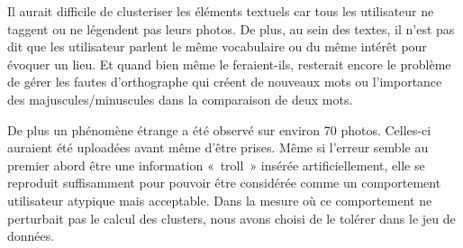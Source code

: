 Il aurait difficile de clusteriser les éléments textuels car tous les utilisateur ne taggent ou ne légendent pas leurs photos. De plus, au sein des textes, il n'est pas dit que les utilisateur parlent le même vocabulaire ou du même intérêt pour évoquer un lieu. Et quand bien même le feraient-ils, resterait encore le problème de gérer les fautes d'orthographe qui créent de nouveaux mots ou l'importance des majuscules/minuscules dans la comparaison de deux mots.

De plus un phénomène étrange a été observé sur environ 70 photos. Celles-ci auraient été uploadées avant même d'être prises. Même si l'erreur semble au premier abord être une information «~troll~» insérée artificiellement, elle se reproduit suffisamment pour pouvoir être considérée comme un comportement utilisateur atypique mais acceptable.
Dans la mesure où ce comportement ne perturbait pas le calcul des clusters, nous avons choisi de le tolérer dans le jeu de données.

